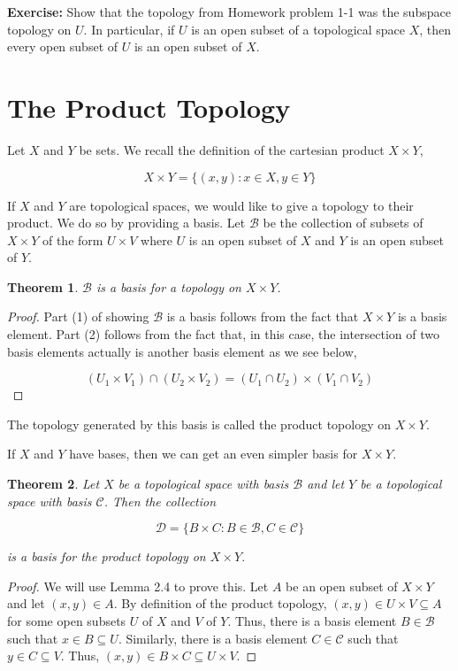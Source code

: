 \documentclass[a4paper]{article}
\newtheorem{theorem}{Theorem}
\numberwithin{theorem}{section}
\begin{document}
\textbf{Exercise:} Show that the topology from Homework problem 1-1 was the subspace topology on $U$. In particular, if $U$ is an open subset of a topological space $X$, then every open subset of $U$ is an open subset of $X$.

\section{The Product Topology}
Let $X$ and $Y$ be sets. We recall the definition of the cartesian product $X \times Y$,

$$ X \times Y = \{(x,y):x \in X , y \in Y\} $$

If $X$ and $Y$ are topological spaces, we would like to give a topology to their product. We do so by providing a basis. Let $\mathcal{B}$ be the collection of subsets of $X \times Y$ of the form $U \times V$ where $U$ is an open subset of $X$ and $Y$ is an open subset of $Y$.

\begin{theorem}
$\mathcal{B}$ is a basis for a topology on $X \times Y$.
\end{theorem}

\begin{proof}
Part (1) of showing $\mathcal{B}$ is a basis follows from the fact that $X \times Y$ is a basis element. Part (2) follows from the fact that, in this case, the intersection of two basis elements actually is another basis element as we see below,

$$ (U_1 \times V_1) \cap (U_2 \times V_2) = (U_1 \cap U_2) \times (V_1 \cap V_2) $$
\end{proof}

The topology generated by this basis is called the product topology on $X \times Y$.

If $X$ and $Y$ have bases, then we can get an even simpler basis for $X \times Y$.

\begin{theorem}
Let $X$ be a topological space with basis $\mathcal{B}$ and let $Y$ be a topological space with basis $\mathcal{C}$. Then the collection

$$\mathcal{D} = \{B \times C: B \in \mathcal{B}, C \in \mathcal{C}\} $$

is a basis for the product topology on $X \times Y$.

\end{theorem}

\begin{proof}
We will use Lemma 2.4 to prove this. Let $A$ be an open subset of $X \times Y$ and let $(x,y) \in A$. By definition of the product topology, $(x,y) \in U \times V \subseteq A$ for some open subsets $U$ of $X$ and $V$ of $Y$. Thus, there is a basis element $B \in \mathcal{B}$ such that $x \in B \subseteq U$. Similarly, there is a basis element $C \in \mathcal{C}$ such that $y \in C \subseteq V$. Thus, $(x,y) \in B \times C \subseteq U \times V$.
\end{proof}
\end{document}
